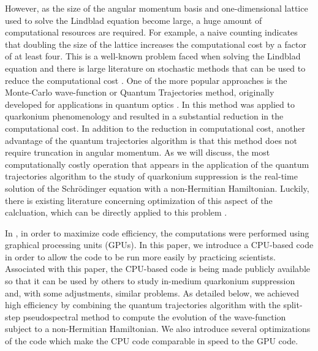 \documentclass[times,sort&compress,final]{elsarticle}
\begin{document}
However, as the size of the angular momentum basis and one-dimensional lattice used to solve the Lindblad equation become large, a huge amount of computational resources are required. 
For example, a naive counting indicates that doubling the size of the lattice increases the computational cost by a factor of at least four. 
This is a well-known problem faced when solving the Lindblad equation and there is large literature on stochastic methods that can be used to reduce the computational cost \cite{Dalibard:1992zz,Molmer:93,Plenio:1997ep,carmichael1999statistical,weissbook,Daley:2014fha}.   
One of the more popular approaches is the Monte-Carlo wave-function or Quantum Trajectories method, originally developed for applications in quantum optics \cite{Dalibard:1992zz}. 
In \cite{Brambilla:2020qwo} this method was applied to quarkonium phenomenology and resulted in a substantial reduction in the computational cost.  
In addition to the reduction in computational cost, another advantage of the quantum trajectories algorithm is that this method does not require truncation in angular momentum.  
As we will discuss, the most computationally costly operation that appears in the application of the quantum trajectories algorithm to the study of quarkonium suppression is the real-time solution of the Schr\"{o}dinger equation with a non-Hermitian Hamiltonian. Luckily, there is existing literature concerning optimization of this aspect of the calcluation, which can be directly applied to this problem \cite{Boyd:2019arx,Islam:2020gdv,Islam:2020bnp}.

In \cite{Brambilla:2020qwo}, in order to maximize code efficiency, the computations were performed using graphical processing units (GPUs). 
In this paper, we introduce a CPU-based code in order to allow the code to be run more easily by practicing scientists. 
Associated with this paper, the CPU-based code is being made publicly available so that it can be used by others to study in-medium quarkonium suppression and, with some adjustments, similar problems. 
As detailed below, we achieved high efficiency by combining the quantum trajectories algorithm with the split-step pseudospectral method to compute the evolution of the wave-function subject to a non-Hermitian Hamiltonian.
We also introduce several optimizations of the code which make the CPU code comparable in speed to the GPU code.
\end{document}
